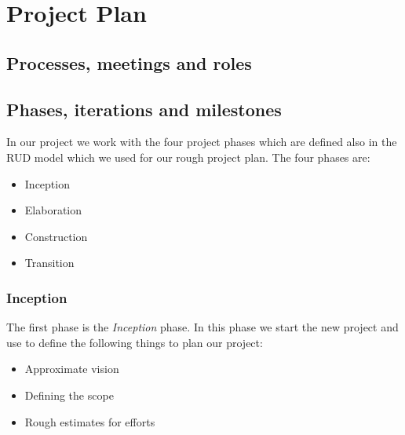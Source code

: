 \chapter{Project Plan}


\section{Processes, meetings and roles}

\section{Phases, iterations and milestones}
In our project we work with the four project phases which are defined also in the RUD model which we used for our rough project plan. The four phases are:
\begin{itemize}
    \item Inception
    \item Elaboration
    \item Construction
    \item Transition
\end{itemize}

\subsection{Inception}
The first phase is the \textit{Inception} phase. In this phase we start the new project and use to define the following things to plan our project:
\begin{itemize}
    \item Approximate vision
    \item Defining the scope
    \item Rough estimates for efforts
\end{itemize}

